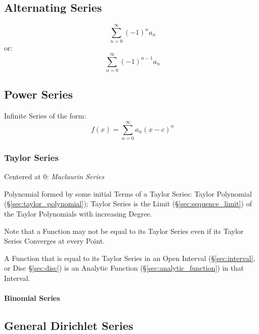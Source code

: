 \subsection{Alternating Series}\label{sec:alternating_series}

\[
  \sum_{n=0}^\infty (-1)^n a_n
\]
or:
\[
  \sum_{n=0}^\infty (-1)^{n-1} a_n
\]



\subsection{Power Series}\label{sec:power_series}

Infinite Series of the form:
\[
  f(x) = \sum_{n=0}^\infty a_n (x - c)^n
\]



\subsubsection{Taylor Series}\label{sec:taylor_series}

Centered at $0$: \emph{Maclaurin Series}

Polynomial formed by some initial Terms of a Taylor Series: Taylor
Polynomial (\S\ref{sec:taylor_polynomial}); Taylor Series is the Limit
(\S\ref{sec:sequence_limit}) of the Taylor Polynomials with increasing
Degree.

Note that a Function may not be equal to its Taylor Series even if its
Taylor Series Converges at every Point.

A Function that is equal to its Taylor Series in an Open Interval
(\S\ref{sec:interval}, or Disc \S\ref{sec:disc}) is an Analytic
Function (\S\ref{sec:analytic_function}) in that Interval.



\paragraph{Binomial Series}\label{sec:binomial_series}\hfill



\subsection{General Dirichlet Series}\label{sec:general_dirichlet}

